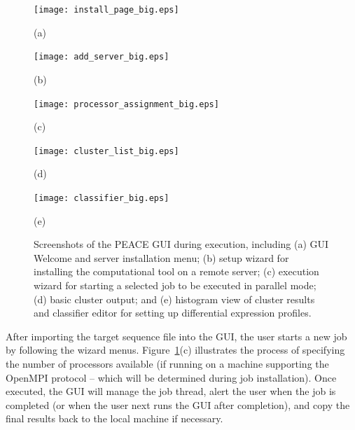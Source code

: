 \documentclass[a4,center,fleqn]{NAR}
\newcommand{\peace} {{\small PEACE}}
\begin{document}
\begin{figure}
  \begin{minipage}{3in}
    \texttt{[image: install\_page\_big.eps]}
    \centerline{\small{(a)}}
  \end{minipage}
  \begin{minipage}{2in}
    \vspace{0.47in}
    \texttt{[image: add\_server\_big.eps]}
    \centerline{\small{(b)}}
  \end{minipage}
  \begin{minipage}{2in}
    \vspace{0.47in}
    \texttt{[image: processor\_assignment\_big.eps]}
    \centerline{\small{(c)}}
  \end{minipage}

  \begin{minipage}{3in}
    \texttt{[image: cluster\_list\_big.eps]}
    \centerline{\small{(d)}}
  \end{minipage}
  \begin{minipage}{1in}
    \hspace{1in}
  \end{minipage}
  \begin{minipage}{3in}
    \texttt{[image: classifier\_big.eps]}
    \centerline{\small{(e)}}
  \end{minipage}

  \caption{Screenshots of the \peace\/ GUI during execution, including (a)
    GUI Welcome and server installation menu; (b) setup wizard for
    installing the computational tool on a remote server; (c) execution
    wizard for starting a selected job to be executed in parallel mode;
    (d) basic cluster output; and (e) histogram view of cluster results
    and classifier editor for setting up differential expression profiles.}\label{screen}
\end{figure}

 After importing the target sequence
file into the GUI, the user starts a new job by following the wizard
menus.  Figure~\ref{screen}(c) illustrates the process of specifying
the number of processors available (if running on a machine supporting
the OpenMPI protocol -- which will be determined during job
installation).  Once executed, the GUI will manage the job thread,
alert the user when the job is completed (or when the user next runs
the GUI after completion), and copy the final results back to the
local machine if necessary.
\end{document}

